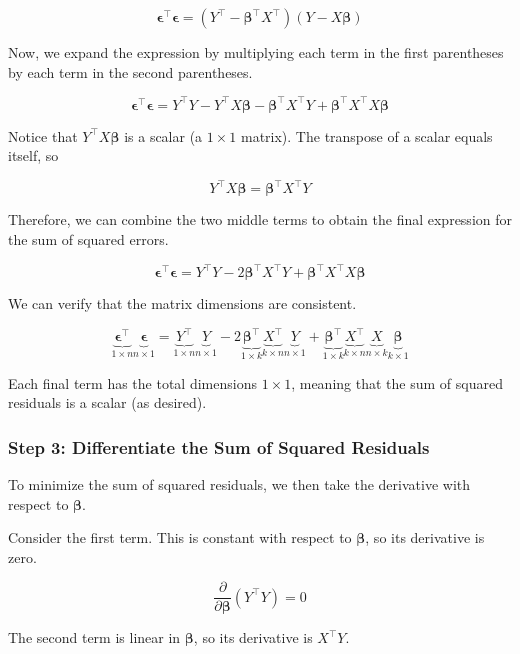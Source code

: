 \documentclass[12pt]{article}
\begin{document}
\[
\boldsymbol{\epsilon}^{\top}\boldsymbol{\epsilon}
=
(Y^{\top}-\boldsymbol{\beta}^{\top}X^{\top})
(Y-X\boldsymbol{\beta})
\]

Now, we expand the expression by multiplying each term in
the first parentheses by each term in the second parentheses.

\[
\boldsymbol{\epsilon}^{\top}\boldsymbol{\epsilon}
=
Y^{\top}Y
-Y^{\top}X\boldsymbol{\beta}
-\boldsymbol{\beta}^{\top}X^{\top}Y
+\boldsymbol{\beta}^{\top}X^{\top}X\boldsymbol{\beta}
\]

Notice that $Y^{\top}X\boldsymbol{\beta}$ is a scalar
(a $1\times1$ matrix). The transpose of a scalar equals
itself, so

\[
Y^{\top}X\boldsymbol{\beta}
=
\boldsymbol{\beta}^{\top}X^{\top}Y
\]

Therefore, we can combine the two middle terms to obtain
the final expression for the sum of squared errors.

\[
\boldsymbol{\epsilon}^{\top}\boldsymbol{\epsilon}
=
Y^{\top}Y
-2\boldsymbol{\beta}^{\top}X^{\top}Y
+\boldsymbol{\beta}^{\top}X^{\top}X\boldsymbol{\beta}
\]

We can verify that the matrix dimensions are consistent.

\[
\underbrace{
\boldsymbol{\epsilon}^{\top}
}_{1\times n}
\underbrace{
\boldsymbol{\epsilon}
}_{n\times1}
=
\underbrace{
Y^{\top}
}_{1\times n}
\underbrace{
Y
}_{n\times1}
-
2
\underbrace{
\boldsymbol{\beta}^{\top}
}_{1\times k}
\underbrace{
X^{\top}
}_{k\times n}
\underbrace{
Y
}_{n\times1}
+
\underbrace{
\boldsymbol{\beta}^{\top}
}_{1\times k}
\underbrace{
X^{\top}
}_{k\times n}
\underbrace{
X
}_{n\times k}
\underbrace{
\boldsymbol{\beta}
}_{k\times1}
\]

Each final term has the total dimensions $1\times1$, meaning that
the sum of squared residuals is a scalar (as desired).


\subsubsection*{Step 3: Differentiate the Sum of Squared Residuals}
To minimize the sum of squared residuals, we then take the derivative
with respect to $\boldsymbol{\beta}$.

Consider the first term. This is constant with respect to
$\boldsymbol{\beta}$, so its derivative is zero.

\[
\frac{\partial}{\partial \boldsymbol{\beta}}
(Y^{\top}Y) = 0
\]

The second term is linear in $\boldsymbol{\beta}$,
so its derivative is $X^{\top}Y$.
\end{document}
